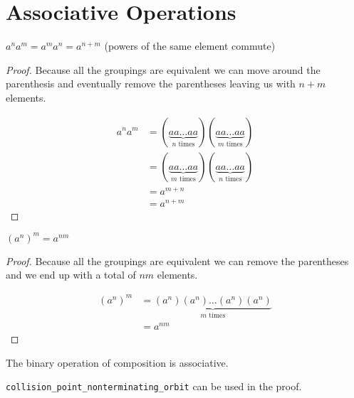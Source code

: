 
\chapter{Associative Operations}


\begin{lemma}
	$a^na^m = a^ma^n = a^{n+m}$ (powers of the same element commute)
\end{lemma}

\begin{proof}
	Because all the groupings are equivalent we can move around the parenthesis and eventually remove
	the parentheses leaving us with $n + m$ elements.

	\begin{align*}
		a^na^m
		&= (\underbrace{aa \ldots aa}_{n \text{ times}})(\underbrace{aa \dots aa}_{m \text{ times}})\\
		&= (\underbrace{aa \ldots aa}_{m \text{ times}})(\underbrace{aa \dots aa}_{n \text{ times}})\\
		&= a^{m + n}\\
		&= a^{n + m}
	\end{align*}
\end{proof}

\begin{lemma}
	$(a^n)^m = a^{nm}$
\end{lemma}

\begin{proof}
	Because all the groupings are equivalent we can remove the parentheses and we end up with a total of
	$nm$ elements.

	\begin{align*}
		(a^n)^m
		&= \underbrace{(a^n)(a^n) \ldots (a^n)(a^n)}_{m \text{ times}}\\
		&= a^{nm}
	\end{align*}
\end{proof}

\begin{lemma}
	The binary operation of composition is associative.
\end{lemma}

\begin{lemma}
	\verb|collision_point_nonterminating_orbit| can be used in the proof.
\end{lemma}
